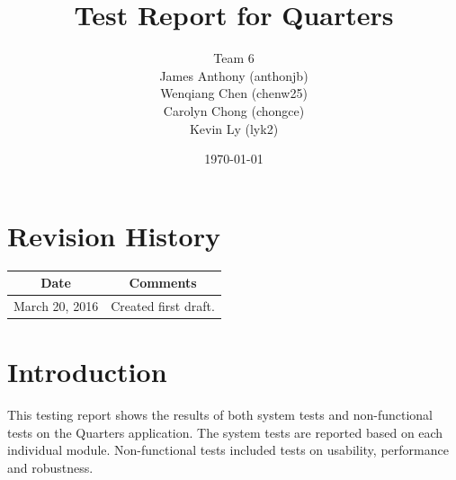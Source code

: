 \documentclass[12pt]{article}
\begin{document}
\title{Test Report for Quarters} 
\author{Team 6\\ James Anthony (anthonjb)\\ Wenqiang Chen (chenw25)\\ Carolyn Chong 
(chongce)\\ Kevin Ly (lyk2)}
\date{\today}
  
\maketitle

\pagebreak

\tableofcontents
\listoffigures
\listoftables

\section*{Revision History}
\begin{tabular}{|c|c|}
\hline
\textbf{Date}  & \textbf{Comments} \\ \hline
March 20, 2016 & Created first draft. \\ 
\hline
\end{tabular}

\pagebreak


\section{Introduction}
This testing report shows the results of both system tests and non-functional tests on the Quarters application. The system tests are reported based on each individual module. Non-functional tests included tests on usability, performance and robustness.

\end{document}
